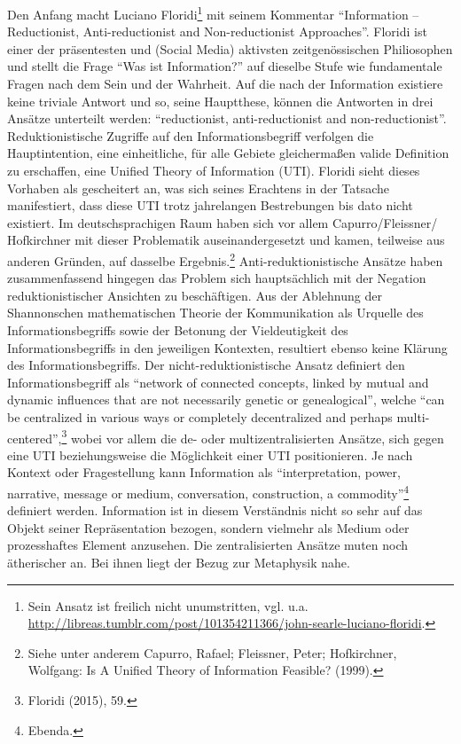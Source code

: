 \documentclass[a4paper,
fontsize=11pt,
oneside,
numbers=noperiodatend,
parskip=half-,
bibliography=totoc,
final
]{scrartcl}
\begin{document}
Den Anfang macht Luciano Floridi\footnote{Sein Ansatz ist freilich nicht
  unumstritten, vgl. u.a.
  \url{http://libreas.tumblr.com/post/101354211366/john-searle-luciano-floridi}.}
mit seinem Kommentar \enquote{Information -- Reductionist,
Anti-reductionist and Non-reductionist Approaches}. Floridi ist einer
der präsentesten und (Social Media) aktivsten zeitgenössischen
Philiosophen und stellt die Frage \enquote{Was ist Information?} auf
dieselbe Stufe wie fundamentale Fragen nach dem Sein und der Wahrheit.
Auf die nach der Information existiere keine triviale Antwort und so,
seine Hauptthese, können die Antworten in drei Ansätze unterteilt
werden: \enquote{reductionist, anti-reductionist and non-reductionist}.
Reduktionistische Zugriffe auf den Informationsbegriff verfolgen die
Hauptintention, eine einheitliche, für alle Gebiete gleichermaßen valide
Definition zu erschaffen, eine Unified Theory of Information (UTI).
Floridi sieht dieses Vorhaben als gescheitert an, was sich seines
Erachtens in der Tatsache manifestiert, dass diese UTI trotz jahrelangen
Bestrebungen bis dato nicht existiert. Im deutschsprachigen Raum haben
sich vor allem Capurro/Fleissner/ Hofkirchner mit dieser Problematik
auseinandergesetzt und kamen, teilweise aus anderen Gründen, auf
dasselbe Ergebnis.\footnote{Siehe unter anderem Capurro, Rafael;
  Fleissner, Peter; Hofkirchner, Wolfgang: Is A Unified Theory of
  Information Feasible? (1999).} Anti-reduktionistische Ansätze haben
zusammenfassend hingegen das Problem sich hauptsächlich mit der Negation
reduktionistischer Ansichten zu beschäftigen. Aus der Ablehnung der
Shannonschen mathematischen Theorie der Kommunikation als Urquelle des
Informationsbegriffs sowie der Betonung der Vieldeutigkeit des
Informationsbegriffs in den jeweiligen Kontexten, resultiert ebenso
keine Klärung des Informationsbegriffs. Der nicht-reduktionistische
Ansatz definiert den Informationsbegriff als \enquote{network of
connected concepts, linked by mutual and dynamic influences that are not
necessarily genetic or genealogical}, welche \enquote{can be centralized
in various ways or completely decentralized and perhaps
multi-centered},\footnote{Floridi (2015), 59.} wobei vor allem die de-
oder multizentralisierten Ansätze, sich gegen eine UTI beziehungsweise
die Möglichkeit einer UTI positionieren. Je nach Kontext oder
Fragestellung kann Information als \enquote{interpretation, power,
narrative, message or medium, conversation, construction, a
commodity}\footnote{Ebenda.} definiert werden. Information ist in diesem
Verständnis nicht so sehr auf das Objekt seiner Repräsentation bezogen,
sondern vielmehr als Medium oder prozesshaftes Element anzusehen. Die
zentralisierten Ansätze muten noch ätherischer an. Bei ihnen liegt der
Bezug zur Metaphysik nahe.
\end{document}
